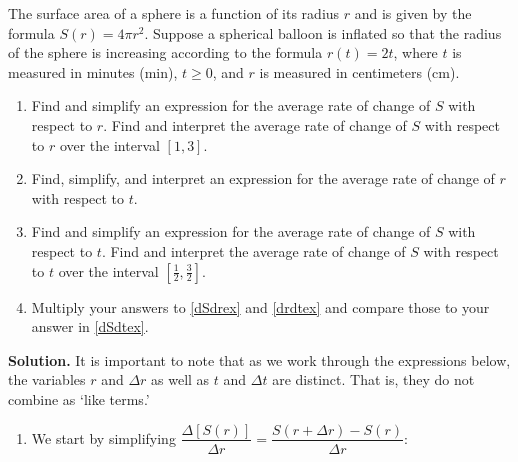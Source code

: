 \documentclass{ximera}
\begin{document}
\begin{example}\label{surfaceareaex2chainrule}  The surface area of a sphere is a function of its radius $r$ and is given by the formula $S(r) = 4 \pi r^2$.  Suppose a spherical balloon is inflated so that the radius of the sphere is increasing according to the formula $r(t) = 2t$, where $t$ is measured in minutes (min), $t \geq 0$, and $r$ is measured in centimeters (cm). 

\begin{enumerate}

\item\label{dSdrex}  Find and simplify an expression for the average rate of change of $S$ with respect to $r$.   Find and interpret the average rate of change of $S$ with respect to $r$  over the interval $[1, 3]$.

\item\label{drdtex} Find, simplify, and interpret an expression for the average rate of change of $r$ with respect to $t$.

\item\label{dSdtex} Find and simplify an expression for the average rate of change of $S$ with respect to $t$.  Find and interpret the average rate of change of $S$ with respect to $t$  over the interval $\left[\frac{1}{2}, \frac{3}{2}\right]$.


\item  Multiply your answers to \ref{dSdrex} and \ref{drdtex} and compare those to your answer in \ref{dSdtex}.

\end{enumerate}

{\bf Solution.}  It is important to note that as we work through the expressions below, the variables $r$ and $\Delta r$ as well as $t$ and $\Delta t$ are distinct. That is, they do not combine as `like terms.'

\begin{enumerate}

\item  We start by simplifying $\dfrac{\Delta[S(r)]}{\Delta r} = \dfrac{S(r+ \Delta r) - S(r)}{\Delta r}$:

\begin{longtable}{rcl}


\end{longtable}
\end{enumerate}
\end{example}
\end{document}
